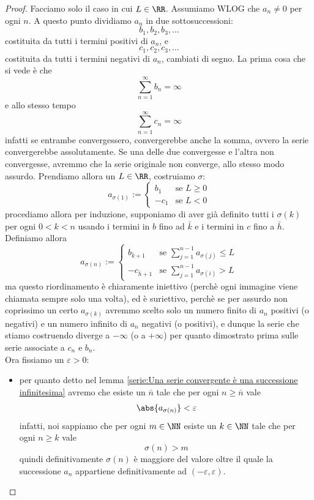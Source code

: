 \documentclass[11pt]{scrartcl}
\begin{document}
  \begin{proof}
  	Facciamo solo il caso in cui $L\in\RR$. Assumiamo WLOG che $a_n\ne 0$ per ogni $n$. A questo punto dividiamo $a_n$ in due sottosuccessioni:
  	$$b_1,b_2,b_3,\dots$$
  	costituita da tutti i termini positivi di $a_n$, e 
  	$$c_1,c_2,c_3,\dots$$
  	costituita da tutti i termini negativi di $a_n$, cambiati di segno. La prima cosa che si vede è che 
  	$$\sum_{n=1}^\infty b_n = \infty$$
  	e allo stesso tempo 
  	$$\sum_{n=1}^\infty c_n = \infty$$
  	infatti se entrambe convergessero, convergerebbe anche la somma, ovvero la serie convergerebbe assolutamente. Se una delle due convergesse e l'altra non convergesse, avremmo che la serie originale non converge, allo stesso modo assurdo. Prendiamo allora un $L\in\RR$, costruiamo $\sigma$:
  	$$a_{\sigma(1)}:=
  	\begin{cases}
  		b_1 & \text{se $L\ge 0$} \\
  		-c_1 & \text{se $L<0$}
  	\end{cases}$$
  	procediamo allora per induzione, supponiamo di aver già definito tutti i $\sigma(k)$ per ogni $0<k< n$ usando i termini in $b$ fino ad $\bar{k}$ e i termini in $c$ fino a $\bar{h}$. Definiamo allora
  	$$a_{\sigma(n)}:=
  	\begin{cases}
  		b_{\bar{k}+1} & \text{se } \sum_{j=1}^{n-1}a_{\sigma(j)}\le L \\
  		-c_{\bar{h}+1} & \text{se } \sum_{j=1}^{n-1}a_{\sigma(i)}>L
  	\end{cases}$$
  	ma questo riordinamento è chiaramente iniettivo (perchè ogni immagine viene chiamata sempre solo una volta), ed è suriettivo, perchè se per assurdo non coprissimo un certo $a_{\sigma(k)}$ avremmo scelto solo un numero finito di $a_n$ positivi (o negativi) e un numero infinito di $a_n$ negativi (o positivi), e dunque la serie che stiamo costruendo diverge a $-\infty$ (o a $+\infty$) per quanto dimostrato prima sulle serie associate a $c_n$ e $b_n$. \\
  	Ora fissiamo un $\varepsilon>0$:
  	\begin{itemize}
  		\item per quanto detto nel lemma \ref{serie:Una serie convergente è una successione infinitesima} avremo che esiste un $\bar{n}$ tale che per ogni $n\ge \bar{n}$ vale
  		$$\abs{a_{\sigma(n)}}<\varepsilon$$
  		infatti, noi sappiamo che per ogni $m\in\NN$ esiste un $k\in\NN$ tale che per ogni $n\ge k$ vale 
  		$$\sigma(n)>m$$
  		quindi definitivamente $\sigma(n)$ è maggiore del valore oltre il quale la successione $a_n$ appartiene definitivamente ad $(-\varepsilon,\varepsilon)$. 

\end{itemize}
\end{proof}
\end{document}
